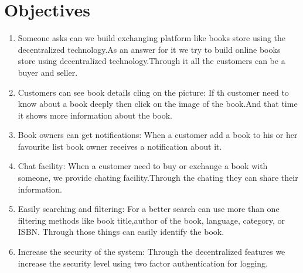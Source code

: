 \documentclass{article}
\begin{document}
\section{Objectives}
\begin{enumerate}
    \item Someone asks can we build exchanging platform like books store using the decentralized technology.As an answer for it we try to build online books store 
	  using decentralized technology.Through it all the customers can be a buyer and seller.
    \item Customers can see book details cling on the picture: If th customer need to know about a book deeply then click on the image of the book.And that time it 
	  shows more information about the book.
    \item Book owners can get notifications: When a customer add a book to his or her favourite list book owner receives a notification about it.
    \item Chat facility: When a customer need to buy or exchange a book with someone, we provide chating facility.Through the chating they can share their information.
    \item Easily searching and filtering: For a better search can use more than one filtering methods like book title,author of the book, language, category, or ISBN.
	  Through those things can easily identify the book.
    \item Increase the security of the system: Through the decentralized features we increase the security level using two factor authentication for logging. 
\end{enumerate}
\end{document}
